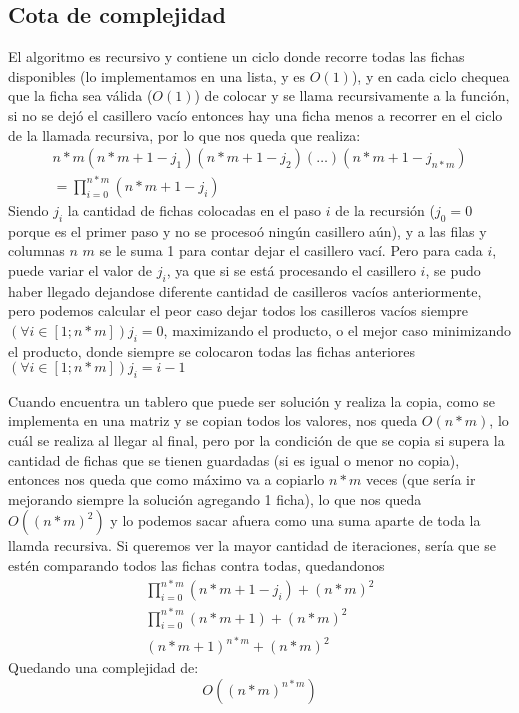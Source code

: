 \subsection{Cota de complejidad} \label{ej_3:cota}

El algoritmo es recursivo y contiene un ciclo donde recorre todas las fichas disponibles (lo implementamos en una lista, y es $O(1)$), y en cada ciclo chequea que la ficha sea v\'alida ($O(1)$) de colocar y se llama recursivamente a la funci\'on, si no se dej\'o el casillero vac\'io entonces hay una ficha menos a recorrer en el ciclo de la llamada recursiva, por lo que nos queda que realiza:
\begin{equation}
\begin{split}
n*m(n*m+1-j_1)(n*m+1-j_2)(\dotsc)(n*m+1-j_{n*m})\\ 
= \prod_{i=0}^{n*m} \left(n*m + 1 - j_i \right)
\end{split}
\end{equation}
Siendo $j_i$ la cantidad de fichas colocadas en el paso $i$ de la recursi\'on ($j_0 = 0$ porque es el primer paso y no se proceso\'o ning\'un casillero a\'un), y a las filas y columnas $n$ $m$ se le suma 1 para contar dejar el casillero vac\'i. Pero para cada $i$, puede variar el valor de $j_i$, ya que si se est\'a procesando el casillero $i$, se pudo haber llegado dejandose diferente cantidad de casilleros vac\'ios anteriormente, pero podemos calcular el peor caso dejar todos los casilleros vac\'ios siempre $(\forall i \in [1;n*m]) j_i = 0$, maximizando el producto, o el mejor caso minimizando el producto, donde siempre se colocaron todas las fichas anteriores $(\forall i \in [1;n*m]) j_i = i - 1$

Cuando encuentra un tablero que puede ser soluci\'on y realiza la copia, como se implementa en una matriz y se copian todos los valores, nos queda $O(n*m)$, lo cu\'al se realiza al llegar al final,
pero por la condici\'on de que se copia si supera la cantidad de fichas que se tienen guardadas (si es igual o menor no copia), entonces nos queda que como m\'aximo va a copiarlo $n*m$ veces (que ser\'ia ir mejorando siempre la soluci\'on agregando 1 ficha), lo que nos queda $O((n*m)^2)$ y lo podemos sacar afuera como una suma aparte de toda la llamda recursiva. Si queremos ver la mayor cantidad de iteraciones, ser\'ia que se est\'en comparando todos las fichas contra todas, quedandonos
\begin{equation}
\begin{split}
	\prod_{i=0}^{n*m} \left(n*m + 1 - j_i \right) + (n*m)^2 \\
	\prod_{i=0}^{n*m} (n*m + 1) + (n*m)^2 \\
	(n*m + 1)^{n*m} + (n*m)^2
\end{split}
\end{equation}
Quedando una complejidad de:
\begin{equation}
	O((n*m)^{n*m}) \label{ej_3:peor_complejidad}
\end{equation}

